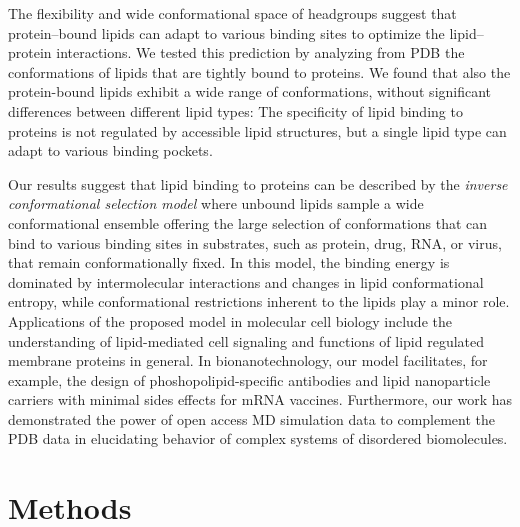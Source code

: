 \documentclass[journal=jpcbfk,manuscript=article]{achemso}
\begin{document}
The flexibility and wide conformational space of headgroups suggest that protein--bound lipids can
adapt to various binding sites to optimize the lipid--protein interactions.
We tested this prediction by analyzing from PDB the conformations of lipids that are tightly bound to proteins.
We found that also the protein-bound lipids exhibit a wide range of conformations, without significant 
differences between different lipid types: The specificity of lipid binding to proteins is not
regulated by accessible lipid structures, but a single lipid type can adapt to various binding pockets.

Our results suggest that lipid binding to proteins can be described by the {\it inverse conformational selection model}
where unbound lipids sample a wide conformational ensemble offering the large selection of conformations
that can bind to various binding sites in substrates, such as protein, drug, RNA, or virus, that remain conformationally fixed.
In this model, the binding energy is dominated by
intermolecular interactions and changes in lipid conformational entropy, while 
conformational restrictions inherent to the lipids play a minor role.
Applications of the proposed model in molecular cell biology include the understanding of lipid-mediated cell signaling
and functions of lipid regulated membrane proteins in general. 
In bionanotechnology, our model facilitates, for example,
the design of phoshopolipid-specific antibodies and lipid nanoparticle carriers with minimal sides effects for mRNA vaccines.
Furthermore, our work has demonstrated the power of open access MD simulation data
to complement the PDB data in elucidating behavior of complex systems of disordered biomolecules.

\section{Methods}
\end{document}
